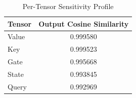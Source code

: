 \documentclass[conference]{IEEEtran}
\begin{document}
\begin{table}[t]
\centering
\caption{Per-Tensor Sensitivity Profile}
\label{tab:tensor_sensitivity}
\begin{tabular}{@{}lc@{}}
\toprule
Tensor & Output Cosine Similarity \\
\midrule
Value & 0.999580 \\
Key & 0.999523 \\
Gate & 0.995668 \\
State & 0.993845 \\
Query & 0.992969 \\
\bottomrule
\end{tabular}
\end{table}
\end{document}
